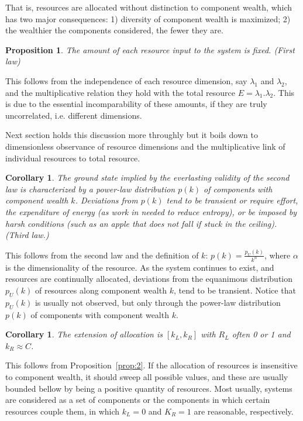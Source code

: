 \documentclass[a4paper, 11pt]{article} %
\newtheorem{proposition}[theorem]{Proposition}
\newtheorem{corollary}[theorem2]{Corollary}
\begin{document}
That is, resources are allocated without distinction to component wealth, which has two major consequences: 1) diversity of component wealth is maximized; 2) the wealthier the components considered, the fewer they are. 

\begin{proposition}\label{prop:1}
	The amount of each resource input to the system is fixed. (First law)
\end{proposition}

This follows from the independence of each resource dimension,
say $\lambda_1$ and $\lambda_2$, and
the multiplicative relation they hold with the total resource $E=\lambda_1 . \lambda_2$.
This is due to the essential incomparability of these amounts, if they are truly uncorrelated, i.e. different dimensions.

Next section holds this discussion more throughly
but it
boils down to dimensionless observance of resource
dimensions and the multiplicative link of individual resources
to total resource. 

\begin{corollary}\label{prop:3}
	The ground state implied by the everlasting validity of the second law is characterized by
	a power-law distribution $p(k)$ of components with component wealth $k$. Deviations from $p(k)$ tend to be transient or require effort, the expenditure of energy (as work in needed to reduce entropy), or be imposed by harsh conditions (such as an apple that does not fall if stuck in the ceiling). (Third law.)
\end{corollary}

This follows from the second law and the definition of $k$:
$p(k)=\frac{p_U(k)}{k^\alpha}$, where $\alpha$ is
the dimensionality of the resource.
As the system continues to exist,
and resources are continually allocated, deviations from the equanimous
distribution $p_U(k)$ of resources along component wealth $k$,
 tend to be transient.
 Notice that $p_U(k)$ is usually not observed, but only through 
 the power-law distribution $p(k)$ of components
with component wealth $k$.

\begin{corollary}
	The extension of allocation is $[k_L,k_R]$ with $R_L$ often 0 or 1 and $k_R\approx C$.
\end{corollary}

This follows from Proposition~\ref{prop:2}.
If the allocation of resources is insensitive to component wealth,
it should sweep all possible values, and these are usually
bounded bellow by being a positive quantity of resources.
Most usually, systems are considered as a set of components
or the components in which certain resources couple them,
in which $k_L=0$ and $K_R=1$ are reasonable, respectively.
\end{document}
